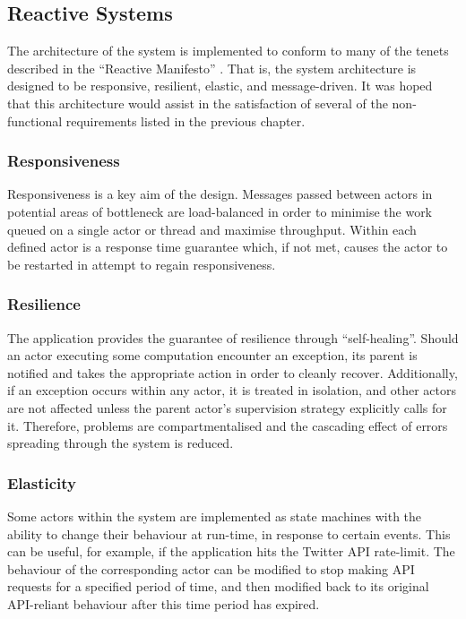 \documentclass{l4proj}
\begin{document}
        \subsection{Reactive Systems}
        The architecture of the system is implemented to conform to many of the tenets described in the ``Reactive Manifesto'' \cite{reactive}. That is, the system architecture is designed to be responsive, resilient, elastic, and message-driven. It was hoped that this architecture would assist in the satisfaction of several of the non-functional requirements listed in the previous chapter.
        
            \subsubsection{Responsiveness}
            Responsiveness is a key aim of the design. Messages passed between actors in potential areas of bottleneck are load-balanced in order to minimise the work queued on a single actor or thread and maximise throughput. Within each defined actor is a response time guarantee which, if not met, causes the actor to be restarted in attempt to regain responsiveness. 
            
            \subsubsection{Resilience}
            The application provides the guarantee of resilience through ``self-healing''. Should an actor executing some computation encounter an exception, its parent is notified and takes the appropriate action in order to cleanly recover. Additionally, if an exception occurs within any actor, it is treated in isolation, and other actors are not affected unless the parent actor's supervision strategy explicitly calls for it. Therefore, problems are compartmentalised and the cascading effect of errors spreading through the system is reduced.
            
            \subsubsection{Elasticity}
            Some actors within the system are implemented as state machines with the ability to change their behaviour at run-time, in response to certain events. This can be useful, for example, if the application hits the Twitter API rate-limit. The behaviour of the corresponding actor can be modified to stop making API requests for a specified period of time, and then modified back to its original API-reliant behaviour after this time period has expired.
            
\end{document}
